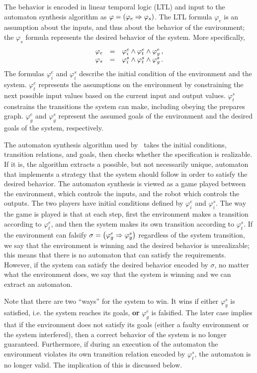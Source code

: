 The behavior is encoded in linear temporal logic (LTL) and input to the automaton
synthesis algorithm as $\varphi=\prl{\varphi_e \Rightarrow \varphi_s}$.  The LTL
formula $\varphi_e$ is an assumption about the inputs, and thus about the behavior of
the environment; the $\varphi_s$ formula represents the desired behavior of the
system.  More specifically,
\[
\bba{ccl}
\varphi_e & = & \varphi_i^e \wedge \varphi_t^e \wedge \varphi_g^e\,, \nonumber\\
\varphi_s & = &\varphi_i^s \wedge \varphi_t^s \wedge \varphi_g^s\,.\nonumber
\eba
\]
The formulas $\varphi_i^e$ and $\varphi_i^s$ describe the initial condition of the
environment and the system. $\varphi_t^e$ represents the assumptions on the
environment by constraining the next possible input values based on the current input
and output values. $\varphi_t^s$ constrains the transitions the system can make,
including obeying the prepares graph.  $\varphi_g^e$ and $\varphi_g^s$ represent the
assumed goals of the environment and the desired goals of the system, respectively.

The automaton synthesis algorithm used by~\cite{hadas_07} takes the initial
conditions, transition relations, and goals, then checks whether the specification is
realizable.  If it is, the algorithm extracts a possible, but not necessarily unique,
automaton that implements a strategy that the system should follow in order to
satisfy the desired behavior.  The automaton synthesis is viewed as a game played
between the environment, which controls the inputs, and the robot which controls the
outputs.  The two players have initial conditions defined by $\varphi_i^e$ and
$\varphi_i^s$.  The way the game is played is that at each step, first the
environment makes a transition according to $\varphi_t^e$, and then the system makes
its own transition according to $\varphi_t^s$.  If the environment can falsify
$\sigma = \prl{\varphi_g^e\Rightarrow\varphi_g^s}$ regardless of the system
transition, we say that the environment is winning and the desired behavior is
unrealizable; this means that there is no automaton that can satisfy the
requirements.  However, if the system can satisfy the desired behavior encoded by
$\sigma$, no matter what the environment does, we say that the system is winning and
we can extract an automaton.

Note that there are two ``ways'' for the system to win. It wins if
either $\varphi_g^s$ is satisfied, i.e.  the system reaches its goals,
\textbf{or} $\varphi_g^e$ is falsified.  The later case implies that
if the environment does not satisfy its goals (either a faulty
environment or the system interfered), then a correct behavior of the
system is no longer guaranteed.  Furthermore, if during an execution
of the automaton the environment violates its own transition relation
encoded by $\varphi_t^s$, the automaton is no longer valid.  The
implication of this is discussed below.

